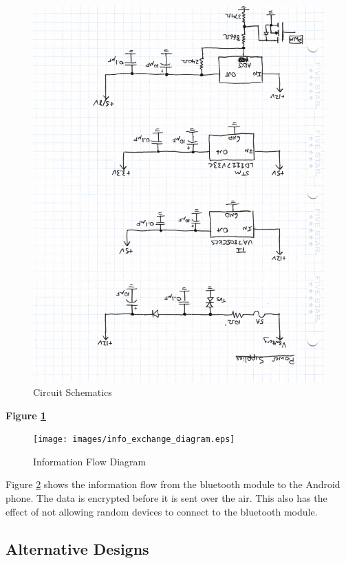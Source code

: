 \documentclass[12pt,letterpaper]{article}
\begin{document}
\begin{figure}[H]
\centering
\includegraphics[page=4, totalheight=20cm, angle=180]{images/circuit_sch.pdf}
\caption{Circuit Schematics}
\label{fig:can}
\end{figure}

\textbf{Figure \ref{fig:can}} 

\begin{figure}[H]
\centering
\texttt{[image: images/info\_exchange\_diagram.eps]}
\caption{Information Flow Diagram}
\label{fig: flow}
\end{figure}

Figure \ref{fig: flow} shows the information flow from the bluetooth module to the Android phone. The data is encrypted before it is sent over the air. This also has the effect of not allowing random devices to connect to the bluetooth module. 

\subsection{Alternative Designs}
\end{document}
